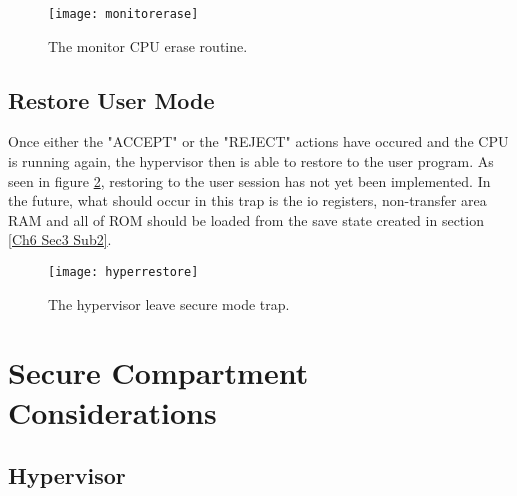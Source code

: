 \begin{figure}
  \centering
  \texttt{[image: monitorerase]}
  \caption{The monitor CPU erase routine.}
  \label{fig:monitorerase}
\end{figure}


\subsection{Restore User Mode}

\label{Ch6 Sec3 Sub5}

Once either the "ACCEPT" or the "REJECT" actions have occured and the CPU is running again, the hypervisor then is able to restore to the user program. As seen in figure \ref{fig:hyperrestore}, restoring to the user session has not yet been implemented. In the future, what should occur in this trap is the io registers, non-transfer area RAM and all of ROM should be loaded from the save state created in section \ref{Ch6 Sec3 Sub2}.

\begin{figure}
  \centering
  \texttt{[image: hyperrestore]}
  \caption{The hypervisor leave secure mode trap.}
  \label{fig:hyperrestore}
\end{figure}


\section{Secure Compartment Considerations}

\label{Ch6 Sec4}


\subsection{Hypervisor}

\label{Ch6 Sec4 Sub1}


